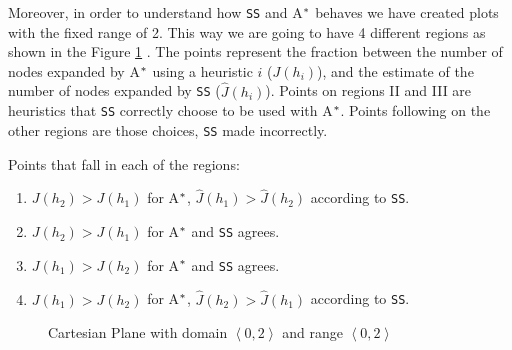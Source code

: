 Moreover, in order to understand how \texttt{SS} and A$\sp{*}$ behaves we have created plots with the fixed range of 2. This way we are going to have 4 different regions as shown in the Figure \ref{fig:img_cartesian_plane} . The points represent the fraction between the  number of nodes expanded by A$\sp{*}$ using a heuristic $i$ ($J(h_{i})$), and the estimate of the number of nodes expanded by \texttt{SS} ($\hat{J}(h_{i})$). Points on regions II and III are heuristics that \texttt{SS} correctly choose to be used with A$\sp{*}$. Points following on the other regions are those choices, \texttt{SS} made incorrectly.

Points that fall in each of the regions:
\begin{enumerate}[label=\Roman*]
\item $J(h_{2}) > J(h_{1})$ for A$\sp{*}$, $\hat{J}(h_{1}) > \hat{J}(h_{2})$ according to \texttt{SS}. 
\item $J(h_{2}) > J(h_{1})$ for A$\sp{*}$ and \texttt{SS} agrees.
\item $J(h_{1}) > J(h_{2})$ for A$\sp{*}$ and \texttt{SS} agrees.
\item $J(h_{1}) > J(h_{2})$ for A$\sp{*}$, $\hat{J}(h_{2}) > \hat{J}(h_{1})$ according to \texttt{SS}.
\end{enumerate}

\pagestyle{empty}

\begin{figure}[!htb]
\centering  
{}
  \caption{Cartesian Plane with domain $\left\langle 0, 2\right\rangle$ and range $\left\langle 0, 2\right\rangle$ }\label{fig:img_cartesian_plane}
\end{figure}

